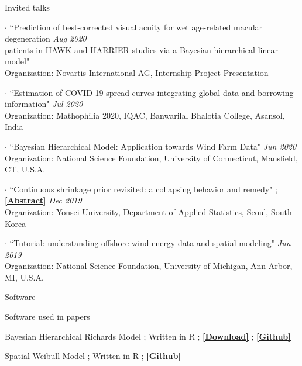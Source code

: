 \documentclass{resume} %
\begin{document}
\begin{rSection}{Invited talks}
\item[$\cdot$]
{``Prediction of best-corrected visual acuity for wet age-related macular degeneration}  \hfill {\em Aug 2020}
\\
{ patients in HAWK and HARRIER studies via a Bayesian hierarchical linear model"}
\\
Organization: Novartis International AG, Internship Project Presentation

\item[$\cdot$]
{``Estimation of COVID-19 spread curves integrating global data and borrowing  information"}  \hfill {\em Jul 2020}
\\
Organization: Mathophilia 2020, IQAC, Banwarilal Bhalotia College, Asansol, India


\item[$\cdot$]
{``Bayesian Hierarchical Model: Application towards Wind
Farm Data"}  \hfill {\em Jun 2020}
\\
Organization: National Science Foundation, University of Connecticut, Mansfield, CT, U.S.A.

\item[$\cdot$]
{``Continuous shrinkage prior revisited: a collapsing behavior and remedy"}  
;
\href{https://stat.yonsei.ac.kr/stat/board/grad_notice.do?mode=view&articleNo=76831&article.offset=0&articleLimit=10}
{\underline{\textbf{[Abstract]}}}
\hfill {\em Dec 2019}
\\
Organization: Yonsei University, Department of Applied Statistics, Seoul, South Korea


\item[$\cdot$]
{``Tutorial: understanding offshore wind energy data and spatial modeling"}  \hfill {\em Jun 2019}
\\
Organization: National Science Foundation, University of Michigan, Ann Arbor, MI, U.S.A.
\end{rSection}


\begin{rSection}{Software}
\begin{rSubsection}
{Software used in papers}{}{}{}
\item 
\textsf{Bayesian Hierarchical Richards Model} 
;
Written in R
;
\href{http://www.plosone.org/article/fetchSingleRepresentation.action?uri=info:doi/10.1371/journal.pone.0236860.s005}
{\underline{\textbf{[Download]}}}
;
\href{https://github.com/StevenBoys/BHRM}{\underline{\textbf{[Github]}}}

\item 
\textsf{Spatial Weibull Model} 
;
Written in R
;
\href{https://github.com/yain22/SWM}
{\underline{\textbf{[Github]}}}
\end{rSubsection}
\end{rSection}
\end{document}
